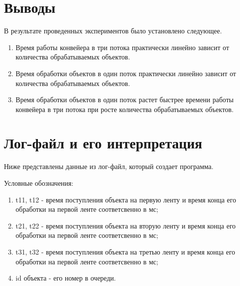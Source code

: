 \documentclass[a4paper,14pt]{report}
\begin{document}
\newpage

\section*{Выводы}

В результате проведенных экспериментов было установлено следующее.
\begin{enumerate}
	\item Время работы конвейера в три потока практически линейно зависит от количества обрабатываемых объектов.
	\item Время обработки объектов в один поток практически линейно зависит от количества обрабатываемых объектов.
	\item Время обработки объектов в один поток растет быстрее времени работы конвейера в три потока при росте количества обрабатываемых объектов.
\end{enumerate}

\section*{Лог-файл и его интерпретация}

Ниже представлены данные из лог-файл, который создает программа.

Условные обозначения:
\begin{enumerate}
	\item t11, t12 - время поступления объекта на первую ленту и время конца его обработки на первой ленте соответсвенно в мс;
	\item t21, t22 - время поступления объекта на вторую ленту и время конца его обработки на первой ленте соответсвенно в мс;
	\item t31, t32 - время поступления объекта на третью ленту и время конца его обработки на первой ленте соответсвенно в мс;
	\item id объекта - его номер в очереди.
\end{enumerate}
\end{document}

